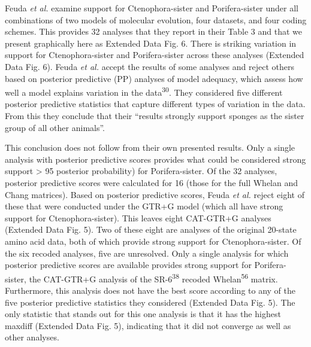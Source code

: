 \documentclass[]{article}
\begin{document}
Feuda \emph{et al.} examine support for Ctenophora-sister and
Porifera-sister under all combinations of two models of molecular
evolution, four datasets, and four coding schemes. This provides 32
analyses that they report in their Table 3 and that we present
graphically here as Extended Data Fig. 6. There is striking variation in
support for Ctenophora-sister and Porifera-sister across these analyses
(Extended Data Fig. 6). Feuda \emph{et al.} accept the results of some
analyses and reject others based on posterior predictive (PP) analyses
of model adequacy, which assess how well a model explains variation in
the data\textsuperscript{30}. They considered five different posterior
predictive statistics that capture different types of variation in the
data. From this they conclude that their ``results strongly support
sponges as the sister group of all other animals''.

This conclusion does not follow from their own presented results. Only a
single analysis with posterior predictive scores provides what could be
considered strong support \textgreater{} 95 posterior probability) for
Porifera-sister. Of the 32 analyses, posterior predictive scores were
calculated for 16 (those for the full Whelan and Chang matrices). Based
on posterior predictive scores, Feuda \emph{et al.} reject eight of
these that were conducted under the GTR+G model (which all have strong
support for Ctenophora-sister). This leaves eight CAT-GTR+G analyses
(Extended Data Fig. 5). Two of these eight are analyses of the original
20-state amino acid data, both of which provide strong support for
Ctenophora-sister. Of the six recoded analyses, five are unresolved.
Only a single analysis for which posterior predictive scores are
available provides strong support for Porifera-sister, the CAT-GTR+G
analysis of the SR-6\textsuperscript{38} recoded
Whelan\textsuperscript{56} matrix. Furthermore, this analysis does not
have the best score according to any of the five posterior predictive
statistics they considered (Extended Data Fig. 5). The only statistic
that stands out for this one analysis is that it has the highest maxdiff
(Extended Data Fig. 5), indicating that it did not converge as well as
other analyses.
\end{document}
